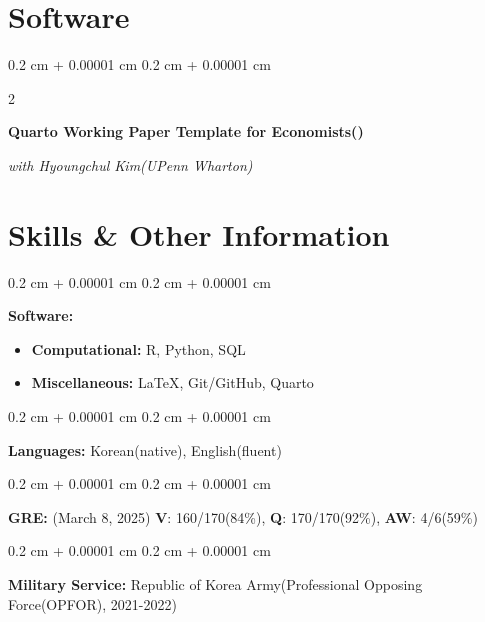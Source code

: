 \documentclass[10pt, letterpaper]{article}
\newenvironment{onecolentry}{
	\begin{adjustwidth}{
			0.2 cm + 0.00001 cm
		}{
			0.2 cm + 0.00001 cm
		}
	}{
	\end{adjustwidth}
} %
\newenvironment{twocolentry}[2][]{
	\onecolentry
	\def\secondColumn{#2}
	\setcolumnwidth{\fill, 4.5 cm}
	\begin{paracol}{2}
	}{
		\switchcolumn \raggedleft \secondColumn
	\end{paracol}
	\endonecolentry
} %
\let\hrefWithoutArrow\href
\renewcommand{\href}[2]{\hrefWithoutArrow{#1}{\ifthenelse{\equal{#2}{}}{ }{#2 }\raisebox{.15ex}{\footnotesize \faExternalLink*}}}
\begin{document}
\vspace{12pt}

\section{Software}
\begin{twocolentry}{
	\textit{}    
	
	\textit{}}
\textbf{Quarto Working Paper Template for Economists(\href{https://github.com/hchulkim/econ-paper-template}{repo})}

\textit{with Hyoungchul Kim(UPenn Wharton)}
\end{twocolentry}

\section{Skills \& Other Information}
	
	\begin{onecolentry}
		\textbf{Software:} 
		\begin{itemize}
			\item \textbf{Computational:} R, Python, SQL
			\item \textbf{Miscellaneous:} \LaTeX, Git/GitHub, Quarto
		\end{itemize}
	\end{onecolentry}
	
	
	\vspace{0.2 cm}
	
	\begin{onecolentry}
		\textbf{Languages:} Korean(native), English(fluent)
	\end{onecolentry}
	
	\vspace{0.2 cm}
	
	\begin{onecolentry}
		\textbf{GRE:} (March 8, 2025) \textbf{V}: 160/170(84\%), \textbf{Q}: 170/170(92\%), \textbf{AW}: 4/6(59\%)
	\end{onecolentry}
	
	\vspace{0.2 cm}

	\begin{onecolentry}
		\textbf{Military Service:} Republic of Korea Army(Professional Opposing Force(OPFOR), 2021-2022)
	\end{onecolentry}
	
\end{document}
